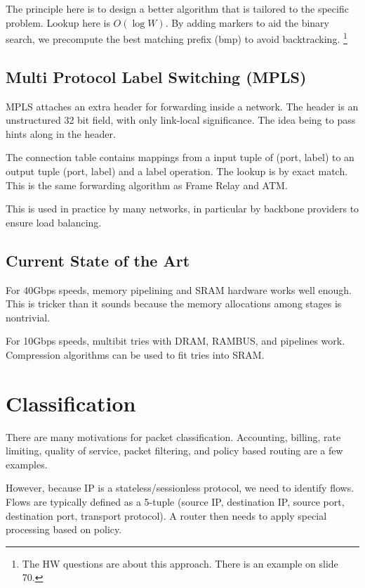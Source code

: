\documentclass{idc_msc}
\begin{document}
The principle here is to design a better algorithm that is tailored to the specific problem.
Lookup here is \(O(\log W)\).
By adding markers to aid the binary search, we precompute the best matching prefix (bmp) to avoid backtracking.
\footnote{The HW questions are about this approach. There is an example on slide 70.}

\subsection{Multi Protocol Label Switching (MPLS)}

MPLS attaches an extra header for forwarding inside a network.
The header is an unstructured 32 bit field, with only link-local significance.
The idea being to pass hints along in the header.

The connection table contains mappings from a input tuple of (port, label) to an output tuple (port, label) and a label operation.
The lookup is by exact match.
This is the same forwarding algorithm as Frame Relay and ATM.

This is used in practice by many networks, in particular by backbone providers to ensure load balancing.

\subsection{Current State of the Art}

For 40Gbps speeds, memory pipelining and SRAM hardware works well enough.
This is tricker than it sounds because the memory allocations among stages is nontrivial.

For 10Gbps speeds, multibit tries with DRAM, RAMBUS, and pipelines work.
Compression algorithms can be used to fit tries into SRAM.

\clearpage
\section{Classification}

There are many motivations for packet classification.
Accounting, billing, rate limiting, quality of service, packet filtering, and policy based routing are a few examples.

However, because IP is a stateless/sessionless protocol, we need to identify flows.
Flows are typically defined as a 5-tuple (source IP, destination IP, source port, destination port, transport protocol).
A router then needs to apply special processing based on policy.
\end{document}
